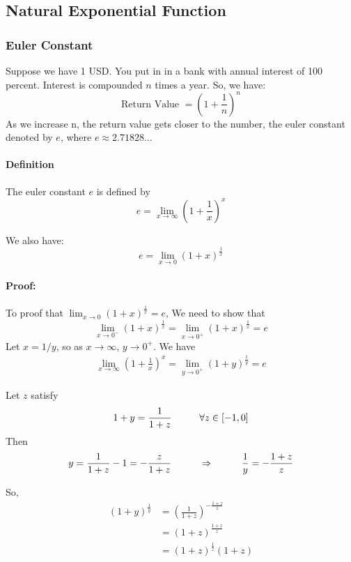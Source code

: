 \documentclass[12pt]{article}
\newcommand\tab[1][1cm]{\hspace*{#1}}
\begin{document}
\subsection{Natural Exponential Function}
\subsubsection{Euler Constant}
Suppose we have 1 USD. You put in in a bank with annual interest of 100 percent. Interest is compounded $n$ times a year. 
So, we have:
\[
    \textrm{Return Value } = \left(1 + \frac{1}{n} \right)^n
\]
As we increase n, the return value gets closer to the number, the euler constant denoted by $e$, where
$e \approx 2.71828...$

\paragraph{Definition}
The euler constant $e$ is defined by 
\[
    e = \lim_{x \to \infty} \left( 1 + \frac{1}{x} \right)^x
\]

\noindent
We also have:
\[
    e = \lim_{x \to 0} (1 + x)^{\frac{1}{x}}
\]

\paragraph{Proof:} To proof that $\lim_{x \to 0} (1 + x)^{\frac{1}{x}} = e$, We need to show that 
\[ 
    \lim_{x \to 0^{-}} (1 + x)^{\frac{1}{x}} = \lim_{x \to 0^{+}} (1 + x)^{\frac{1}{x}} = e
\]
\noindent
Let $x = 1/y$, so as $x \to \infty$, $y \to 0^{+}$. We have
\begin{align*} 
    \lim_{x \to \infty} \left( 1 + \frac{1}{x} \right)^x = \lim_{y \to 0^{+}} \left( 1 + y \right)^{\frac{1}{y}} = e
\end{align*}

\noindent
Let $z$ satisfy
\[
    1 + y = \frac{1}{1 + z} \textrm{\tab} \forall z \in [ - 1, 0]
\]
Then
\begin{align*} 
    y = \frac{1}{1 + z} - 1 = - \frac{z}{1 + z} \textrm{\tab} \Rightarrow \textrm{\tab} \frac{1}{y} = - \frac{1 + z}{z} \\
\end{align*}

\noindent
So,
\begin{align*} 
    (1 + y)^{\frac{1}{y}} &= \left(\frac{1}{1 + z} \right)^{ -\frac{1 + z}{z}} \\
    &= (1 + z)^{\frac{1 + z}{z}} \\
    &= (1 + z)^{\frac{1}{z}}(1 + z)
\end{align*}
\end{document}
